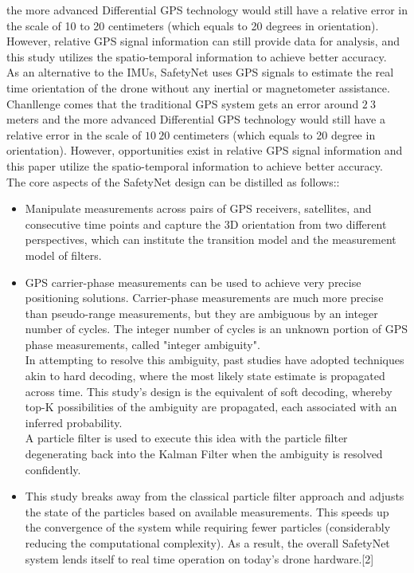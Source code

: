 \documentclass[journal,onecolumn]{IEEEtran}
\begin{document}
the more advanced Differential GPS technology would still have a relative error in the scale of 10 to 20 centimeters (which
equals to 20 degrees in orientation). However, relative GPS signal information can still provide data for analysis, and this study utilizes the
spatio-temporal information to achieve better accuracy.\\
As an alternative to the IMUs, SafetyNet uses GPS signals to estimate the real time
orientation of the drone without any inertial or magnetometer assistance.
Chanllenge comes that the traditional GPS system gets an error around $2~3$ meters
and the more advanced Differential GPS technology would still have a relative error
in the scale of $10~20$ centimeters (which equals to 20 degree in orientation).
However, opportunities exist in relative GPS signal information and this paper utilize
the spatio-temporal information to achieve better accuracy.\\
The core aspects of the SafetyNet design can be distilled as follows::
\begin{itemize}
  \item Manipulate measurements across pairs of GPS receivers, satellites, and consecutive time points and capture the 3D orientation
from two different perspectives, which can institute the transition model and the measurement model of filters.
  \item GPS carrier-phase measurements can be used to achieve very precise positioning solutions. Carrier-phase measurements
are much more precise than pseudo-range measurements, but they are ambiguous by an integer number of cycles. The
integer number of cycles is an unknown portion of GPS phase measurements, called "integer ambiguity".\\
  In attempting to resolve this ambiguity, past studies have adopted techniques akin to hard decoding, where the most likely
state estimate is propagated across time. This study's design is the equivalent of soft decoding, whereby top-K possibilities
of the ambiguity are propagated, each associated with an inferred probability.\\
A particle filter is used to execute this idea with the particle filter degenerating back into the Kalman Filter when the ambiguity
is resolved confidently.

  \item This study breaks away from the classical particle filter approach and adjusts the state of the particles based on available
measurements. This speeds up the convergence of the system while requiring fewer particles (considerably reducing the
computational complexity). As a result, the overall SafetyNet system lends itself to real time operation on today's drone
hardware.[2]
\end{itemize}
\end{document}
